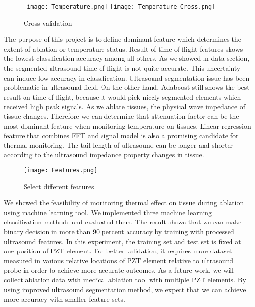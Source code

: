 \documentclass[11pt,letterpaper]{article}
\begin{document}
 	\begin{figure}[!htbp]
 		\texttt{[image: Temperature.png]}
 		\texttt{[image: Temperature\_Cross.png]}
 		\caption{Cross validation}
 		\label{fig:4}       %
 	\end{figure}
%

The purpose of this project is to define dominant feature which determines the extent of ablation or temperature status. Result of time of flight features shows the lowest classification accuracy among all others. As we showed in data section, the segmented ultrasound time of flight is not quite accurate. This uncertainty can induce low accuracy in classification. Ultrasound segmentation issue has been problematic in ultrasound field. On the other hand, Adaboost still shows the best result on time of flight, because it would pick nicely segmented elements which received high peak signals.  As we ablate tissues, the physical wave impedance of tissue changes. Therefore we can determine that attenuation factor can be the most dominant feature when monitoring temperature on tissues. Linear regression feature that combines FFT and signal model is also a promising candidate for thermal monitoring. The tail length of ultrasound can be longer and shorter according to the ultrasound impedance property changes in tissue.


 	\begin{figure}[!htbp]
 		\texttt{[image: Features.png]}
 		\caption{Select different features}
 		\label{fig:5}       %
 	\end{figure}
%
We showed the feasibility of monitoring thermal effect on tissue during ablation using machine learning tool. We implemented three machine learning classification methods and evaluated them. The result shows that we can make binary decision in more than 90 percent accuracy by training with processed ultrasound features. In this experiment, the training set and test set is fixed at one position of PZT element. For better validation, it requires more dataset measured in various relative locations of PZT element relative to ultrasound probe in order to achieve more accurate outcomes. As a future work, we will collect ablation data with medical ablation tool with multiple PZT elements. By using improved ultrasound segmentation method, we expect that we can achieve more accuracy with smaller feature sets.     
\end{document}
